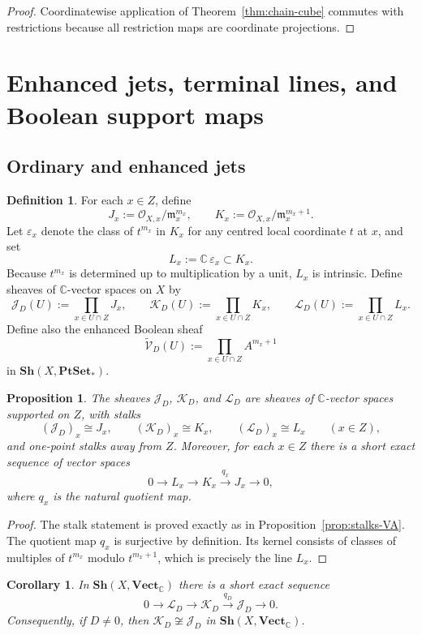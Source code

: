 \documentclass[11pt,a4paper]{article}
\newtheorem{proposition}[theorem]{Proposition}
\newtheorem{corollary}[theorem]{Corollary}
\theoremstyle{definition}
\newtheorem{definition}[theorem]{Definition}
\theoremstyle{remark}
\newcommand{\CC}{\mathbb C}
\newcommand{\PtSet}{\mathbf{PtSet}_*}
\newcommand{\VectC}{\mathbf{Vect}_{\CC}}
\newcommand{\cO}{\mathcal O}
\newcommand{\Jd}{\mathcal J_D}
\newcommand{\Kd}{\mathcal K_D}
\newcommand{\Ld}{\mathcal L_D}
\newcommand{\Vplusd}{\widetilde{\mathcal V}_D}
\newcommand{\epsx}{\varepsilon_x}
\begin{document}
\begin{proof}
Coordinatewise application of Theorem~\ref{thm:chain-cube} commutes with restrictions because all restriction maps are coordinate projections.
\end{proof}

\section{Enhanced jets, terminal lines, and Boolean support maps}

\subsection{Ordinary and enhanced jets}

\begin{definition}
For each $x\in Z$, define
\[
J_x:=\cO_{X,x}/\mathfrak m_x^{m_x},
\qquad
K_x:=\cO_{X,x}/\mathfrak m_x^{m_x+1}.
\]
Let $\epsx$ denote the class of $t^{m_x}$ in $K_x$ for any centred local coordinate $t$ at $x$, and set
\[
L_x:=\CC\,\epsx\subset K_x.
\]
Because $t^{m_x}$ is determined up to multiplication by a unit, $L_x$ is intrinsic.
Define sheaves of $\CC$-vector spaces on $X$ by
\[
\Jd(U):=\prod_{x\in U\cap Z}J_x,
\qquad
\Kd(U):=\prod_{x\in U\cap Z}K_x,
\qquad
\Ld(U):=\prod_{x\in U\cap Z}L_x.
\]
Define also the enhanced Boolean sheaf
\[
\Vplusd(U):=\prod_{x\in U\cap Z}A^{m_x+1}
\]
in $\mathbf{Sh}(X,\PtSet)$.
\end{definition}

\begin{proposition}\label{prop:stalks-jets}
The sheaves $\Jd$, $\Kd$, and $\Ld$ are sheaves of $\CC$-vector spaces supported on $Z$, with stalks
\[
(\Jd)_x\cong J_x,
\qquad
(\Kd)_x\cong K_x,
\qquad
(\Ld)_x\cong L_x
\qquad (x\in Z),
\]
and one-point stalks away from $Z$. Moreover, for each $x\in Z$ there is a short exact sequence of vector spaces
\[
0\longrightarrow L_x\longrightarrow K_x\xrightarrow{q_x}J_x\longrightarrow 0,
\]
where $q_x$ is the natural quotient map.
\end{proposition}

\begin{proof}
The stalk statement is proved exactly as in Proposition~\ref{prop:stalks-VA}. The quotient map $q_x$ is surjective by definition. Its kernel consists of classes of multiples of $t^{m_x}$ modulo $t^{m_x+1}$, which is precisely the line $L_x$.
\end{proof}

\begin{corollary}\label{cor:jets-exact-seq}
In $\mathbf{Sh}(X,\VectC)$ there is a short exact sequence
\[
0\longrightarrow \Ld\longrightarrow \Kd\xrightarrow{q_D}\Jd\longrightarrow 0.
\]
Consequently, if $D\neq 0$, then $\Kd\not\cong \Jd$ in $\mathbf{Sh}(X,\VectC)$.
\end{corollary}
\end{document}
